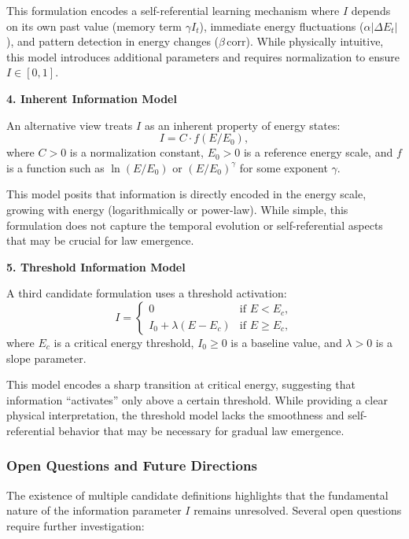 \documentclass[12pt,a4paper]{article}
\theoremstyle{definition}
\theoremstyle{remark}
\begin{document}
This formulation encodes a self-referential learning mechanism where $I$ depends on its own past value (memory term $\gamma I_t$), immediate energy fluctuations ($\alpha |\Delta E_t|$), and pattern detection in energy changes ($\beta \, \mathrm{corr}$). While physically intuitive, this model introduces additional parameters and requires normalization to ensure $I \in [0,1]$.

\textbf{4. Inherent Information Model}

An alternative view treats $I$ as an inherent property of energy states:
\begin{equation}\label{eq:I_inherent}
I = C \cdot f(E/E_0),
\end{equation}
where $C > 0$ is a normalization constant, $E_0 > 0$ is a reference energy scale, and $f$ is a function such as $\ln(E/E_0)$ or $(E/E_0)^\gamma$ for some exponent $\gamma$.

This model posits that information is directly encoded in the energy scale, growing with energy (logarithmically or power-law). While simple, this formulation does not capture the temporal evolution or self-referential aspects that may be crucial for law emergence.

\textbf{5. Threshold Information Model}

A third candidate formulation uses a threshold activation:
\begin{equation}\label{eq:I_threshold}
I = \begin{cases}
0 & \text{if } E < E_c, \\
I_0 + \lambda (E - E_c) & \text{if } E \geq E_c,
\end{cases}
\end{equation}
where $E_c$ is a critical energy threshold, $I_0 \geq 0$ is a baseline value, and $\lambda > 0$ is a slope parameter.

This model encodes a sharp transition at critical energy, suggesting that information ``activates'' only above a certain threshold. While providing a clear physical interpretation, the threshold model lacks the smoothness and self-referential behavior that may be necessary for gradual law emergence.

\subsubsection{Open Questions and Future Directions}

The existence of multiple candidate definitions highlights that the fundamental nature of the information parameter $I$ remains unresolved. Several open questions require further investigation:
\end{document}
